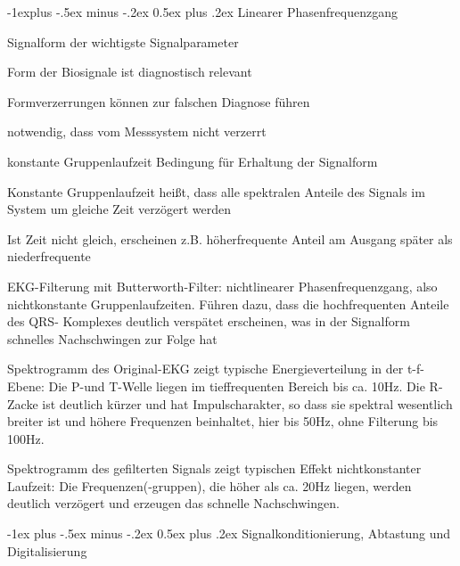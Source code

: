 \documentclass[a4paper]{article}
\makeatletter
\renewcommand{\section}{\@startsection{section}{1}{0mm}%
 {-1ex plus -.5ex minus -.2ex}%
 {0.5ex plus .2ex}%
 {\normalfont\large\bfseries}}
\renewcommand{\subsection}{\@startsection{subsection}{2}{0mm}%
 {-1explus -.5ex minus -.2ex}%
 {0.5ex plus .2ex}%
 {\normalfont\normalsize\bfseries}}
\makeatother
\begin{document}
\begin{multicols}{3}
  \subsection{Linearer Phasenfrequenzgang}\label{linearer-phasenfrequenzgang}
  \begin{itemize*}
    \item Signalform der wichtigste Signalparameter
    \item Form der Biosignale ist diagnostisch relevant
    \item Formverzerrungen können zur falschen Diagnose führen
    \item notwendig, dass vom Messsystem nicht verzerrt
    \item konstante Gruppenlaufzeit Bedingung für Erhaltung der Signalform
    \item Konstante Gruppenlaufzeit heißt, dass alle spektralen Anteile des Signals im System um gleiche Zeit verzögert werden
    \item Ist Zeit nicht gleich, erscheinen z.B. höherfrequente Anteil am Ausgang später als niederfrequente
    \item EKG-Filterung mit Butterworth-Filter: nichtlinearer Phasenfrequenzgang, also nichtkonstante Gruppenlaufzeiten. Führen dazu, dass die hochfrequenten Anteile des QRS- Komplexes deutlich verspätet erscheinen, was in der Signalform schnelles Nachschwingen zur Folge hat
    \item Spektrogramm des Original-EKG zeigt typische Energieverteilung in der t-f-Ebene: Die P-und T-Welle liegen im tieffrequenten Bereich bis ca. 10Hz. Die R-Zacke ist deutlich kürzer und hat Impulscharakter, so dass sie spektral wesentlich breiter ist und höhere Frequenzen beinhaltet, hier bis 50Hz, ohne Filterung bis 100Hz.
    \item Spektrogramm des gefilterten Signals zeigt typischen Effekt nichtkonstanter Laufzeit: Die Frequenzen(-gruppen), die höher als ca. 20Hz liegen, werden deutlich verzögert und erzeugen das schnelle Nachschwingen.
  \end{itemize*}

  \section{Signalkonditionierung, Abtastung und Digitalisierung}\label{signalkonditionierung-abtastung-und-digitalisierung}


\end{multicols}
\end{document}
